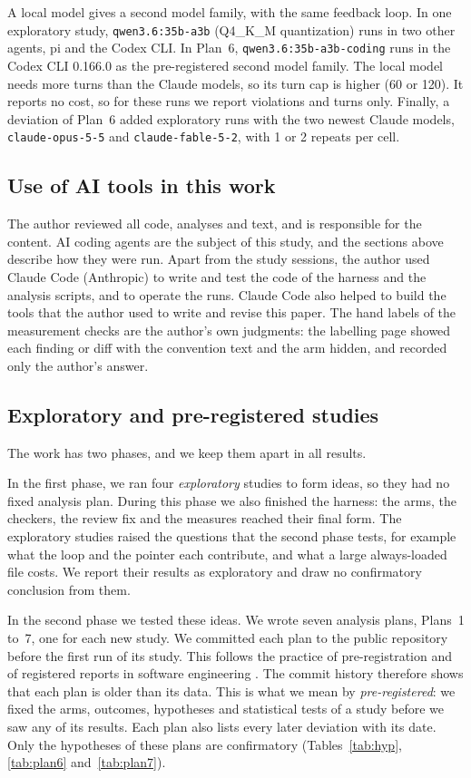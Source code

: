 \documentclass[pdflatex,sn-basic]{sn-jnl}
\begin{document}
A local model gives a second model family, with the same feedback loop.
In one exploratory study, \texttt{qwen3.6:35b-a3b} (Q4\_K\_M quantization) runs in two other agents, pi and the Codex CLI.
In Plan~6, \texttt{qwen3.6:35b-a3b-coding} runs in the Codex CLI 0.166.0 as the pre-registered second model family.
The local model needs more turns than the Claude models, so its turn cap is higher (60 or 120).
It reports no cost, so for these runs we report violations and turns only.
Finally, a deviation of Plan~6 added exploratory runs with the two newest Claude models, \texttt{claude-opus-5-5} and \texttt{claude-fable-5-2}, with 1 or 2 repeats per cell.

\subsection{Use of AI tools in this work}

The author reviewed all code, analyses and text, and is responsible for the content.
AI coding agents are the subject of this study, and the sections above describe how they were run.
Apart from the study sessions, the author used Claude Code (Anthropic) to write and test the code of the harness and the analysis scripts, and to operate the runs.
Claude Code also helped to build the tools that the author used to write and revise this paper.
The hand labels of the measurement checks are the author's own judgments: the labelling page showed each finding or diff with the convention text and the arm hidden, and recorded only the author's answer.

\subsection{Exploratory and pre-registered studies}

The work has two phases, and we keep them apart in all results.

In the first phase, we ran four \emph{exploratory} studies to form ideas, so they had no fixed analysis plan.
During this phase we also finished the harness: the arms, the checkers, the review fix and the measures reached their final form.
The exploratory studies raised the questions that the second phase tests, for example what the loop and the pointer each contribute, and what a large always-loaded file costs.
We report their results as exploratory and draw no confirmatory conclusion from them.

In the second phase we tested these ideas.
We wrote seven analysis plans, Plans~1 to~7, one for each new study.
We committed each plan to the public repository before the first run of its study.
This follows the practice of pre-registration \citep{nosek2018prereg} and of registered reports in software engineering \citep{ernst2023registered}.
The commit history therefore shows that each plan is older than its data.
This is what we mean by \emph{pre-registered}: we fixed the arms, outcomes, hypotheses and statistical tests of a study before we saw any of its results.
Each plan also lists every later deviation with its date.
Only the hypotheses of these plans are confirmatory (Tables~\ref{tab:hyp}, \ref{tab:plan6} and~\ref{tab:plan7}).
\end{document}
